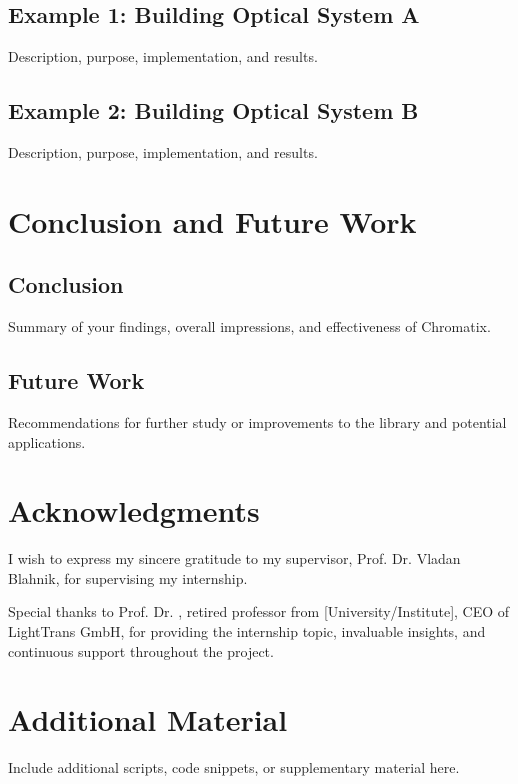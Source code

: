 \documentclass[a4paper,12pt]{report}
\begin{document}
\section{Example 1: Building Optical System A}
Description, purpose, implementation, and results.

\section{Example 2: Building Optical System B}
Description, purpose, implementation, and results.

\chapter{Conclusion and Future Work}
\section{Conclusion}
Summary of your findings, overall impressions, and effectiveness of Chromatix.

\section{Future Work}
Recommendations for further study or improvements to the library and potential applications.

\chapter*{Acknowledgments}
I wish to express my sincere gratitude to my supervisor, Prof. Dr. Vladan Blahnik, for supervising my internship. 

Special thanks to Prof. Dr. , retired professor from [University/Institute], CEO of LightTrans GmbH, for providing the internship topic, invaluable insights, and continuous support throughout the project. 






\appendix
\chapter{Additional Material}
Include additional scripts, code snippets, or supplementary material here.
\end{document}
